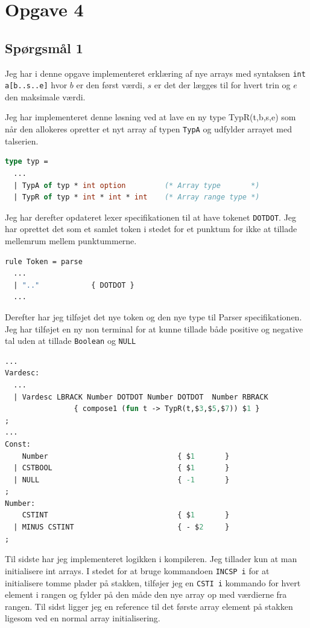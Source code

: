 \documentclass[danish,a4paper]{report}
\begin{document}
\chapter*{Opgave 4}
\section*{Spørgsmål 1}

Jeg har i denne opgave implementeret erklæring af nye arrays med syntaksen \texttt{int a[b..s..e]} hvor $b$ er den først værdi, $s$ er det der lægges til for hvert trin og $e$ den maksimale værdi.

Jeg har implementeret denne løsning ved at lave en ny type TypR(t,b,s,e) som når den allokeres opretter et nyt array af typen \texttt{TypA} og udfylder arrayet med talserien.

  \begin{lstlisting}[language=ML]
type typ =
  ...
  | TypA of typ * int option         (* Array type       *)
  | TypR of typ * int * int * int    (* Array range type *)
\end{lstlisting}

Jeg har derefter opdateret lexer specifikationen til at have tokenet \texttt{DOTDOT}. Jeg har oprettet det som et samlet token i stedet for et punktum for ikke at tillade mellemrum mellem punktummerne.

\begin{lstlisting}[language=ML]
rule Token = parse
  ...
  | ".."            { DOTDOT }
  ...
\end{lstlisting}

Derefter har jeg tilføjet det nye token og den nye type til Parser specifikationen. Jeg har tilføjet en ny non terminal for at kunne tillade både positive og negative tal uden at tillade \texttt{Boolean} og \texttt{NULL}

\begin{lstlisting}[language=ML]
%token BAR DOTDOT
...
Vardesc: 
  ... 
  | Vardesc LBRACK Number DOTDOT Number DOTDOT  Number RBRACK 
                { compose1 (fun t -> TypR(t,$3,$5,$7)) $1 }
;
...
Const:
    Number                              { $1       }
  | CSTBOOL                             { $1       }
  | NULL                                { -1       }
;
Number:
    CSTINT                              { $1       }
  | MINUS CSTINT                        { - $2     }
;
\end{lstlisting}

Til sidste har jeg implementeret logikken i kompileren. Jeg tillader kun at man initialisere int arrays. I stedet for at bruge kommandoen \texttt{INCSP i} for at initialisere tomme plader på stakken, tilføjer jeg en \texttt{CSTI i} kommando for hvert element i rangen og fylder på den måde den nye array op med værdierne fra rangen. Til sidst ligger jeg en reference til det første array element på stakken ligesom ved en normal array initialisering.\newline
\end{document}
